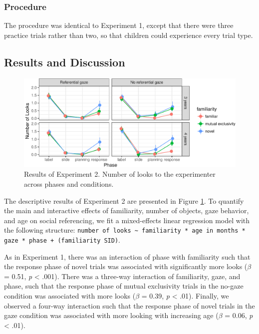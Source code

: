 \documentclass[10pt, letterpaper]{article}
\newenvironment{CodeChunk}{}{}
\begin{document}
\subsubsection{Procedure}\label{procedure-1}

The procedure was identical to Experiment 1, except that there were
three practice trials rather than two, so that children could experience
every trial type.

\subsection{Results and Discussion}\label{results-and-discussion-1}

\begin{CodeChunk}
\begin{figure}[h]

{\centering \includegraphics{figs/results_e2-1} 

}

\caption[Results of Experiment 2]{Results of Experiment 2. Number of looks to the experimenter across phases and conditions.}\label{fig:results_e2}
\end{figure}
\end{CodeChunk}

The descriptive results of Experiment 2 are presented in Figure
\ref{fig:results_e2}. To quantify the main and interactive effects of
familiarity, number of objects, gaze behavior, and age on social
referencing, we fit a mixed-effects linear regression model with the
following structure:
\texttt{number of looks \textasciitilde{} familiarity * age in months * gaze * phase + (familiarity \textbar{} SID)}.

As in Experiment 1, there was an interaction of phase with familiarity
such that the response phase of novel trials was associated with
significantly more looks (\(\beta\) = 0.51, \emph{p} \textless{} .001).
There was a three-way interaction of familiarity, gaze, and phase, such
that the response phase of mutual exclusivity trials in the no-gaze
condition was associated with more looks (\(\beta\) = 0.39, \emph{p}
\textless{} .01). Finally, we observed a four-way interaction such that
the response phase of novel trials in the gaze condition was associated
with more looking with increasing age (\(\beta\) = 0.06, \emph{p}
\textless{} .01).
\end{document}
